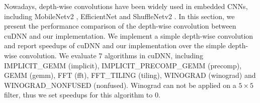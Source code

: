 

Nowadays, depth-wise convolutions have been widely used in embedded CNNs, including MobileNetv2 \cite{Sandler_2018_CVPR}, EfficientNet \cite{tan2019efficientnet} and ShuffleNetv2 \cite{Ma_2018_ECCV}. In this section, we present the performance comparison of the depth-wise convolution between cuDNN and our implementation. We implement a simple depth-wise convolution and report speedups of cuDNN and our implementation over the simple depth-wise convolution. We evaluate 7 algorithms in cuDNN, including IMPLICIT\_GEMM (implicit), IMPLICIT\_PRECOMP\_GEMM (precomp), GEMM (gemm), FFT (fft), FFT\_TILING (tiling), WINOGRAD (winograd) and WINOGRAD\_NONFUSED (nonfused). Winograd can not be applied on a $5 \times 5$ filter, thus we set speedups for this algorithm to 0.


%

